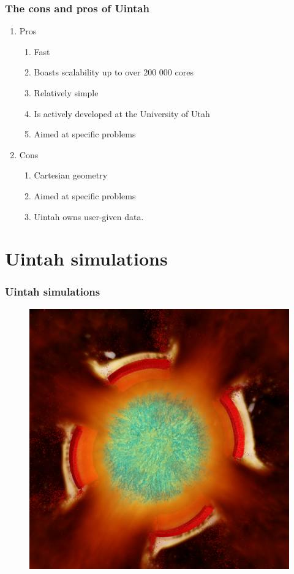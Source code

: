 \documentclass{beamer}
\begin{document}
\begin{frame}
 \frametitle{The cons and pros of Uintah}
 \begin{enumerate}
  \item Pros
  \begin{enumerate}
   \item Fast
   \item Boasts scalability up to over 200 000 cores
   \item Relatively simple
   \item Is actively developed at the University of Utah
   \item Aimed at specific problems
  \end{enumerate}
  \item Cons
  \begin{enumerate}
   \item Cartesian geometry
   \item Aimed at specific problems
   \item Uintah owns user-given data.
  \end{enumerate}
 \end{enumerate}
\end{frame}

\section{Uintah simulations}

\begin{frame}[fragile]
 \frametitle{Uintah simulations}
 \begin{figure}
  \centering
  \includegraphics[height=0.7\textheight]{uintah1.png}
 \end{figure}
\end{frame}
\end{document}
